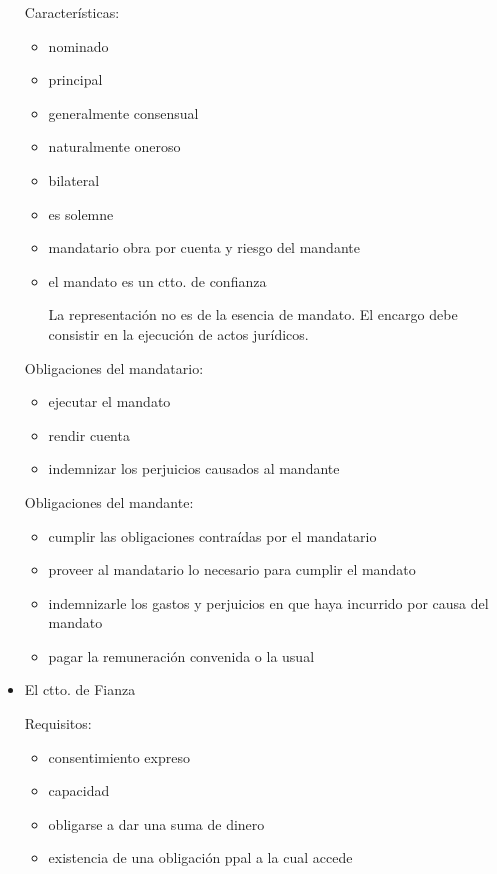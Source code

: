 \documentclass[]{article}
\providecommand{\tightlist}{%
  \setlength{\itemsep}{0pt}\setlength{\parskip}{0pt}}
\begin{document}
\begin{itemize}
  Características:

  \begin{itemize}
  \item
    nominado
  \item
    principal
  \item
    generalmente consensual
  \item
    naturalmente oneroso
  \item
    bilateral
  \item
    es solemne
  \item
    mandatario obra por cuenta y riesgo del mandante
  \item
    el mandato es un ctto. de confianza

    La representación no es de la esencia de mandato. El encargo debe
    consistir en la ejecución de actos jurídicos.
  \end{itemize}

  Obligaciones del mandatario:

  \begin{itemize}
  \tightlist
  \item
    ejecutar el mandato
  \item
    rendir cuenta
  \item
    indemnizar los perjuicios causados al mandante
  \end{itemize}

  Obligaciones del mandante:

  \begin{itemize}
  \tightlist
  \item
    cumplir las obligaciones contraídas por el mandatario
  \item
    proveer al mandatario lo necesario para cumplir el mandato
  \item
    indemnizarle los gastos y perjuicios en que haya incurrido por causa
    del mandato
  \item
    pagar la remuneración convenida o la usual
  \end{itemize}
\item
  El ctto. de Fianza

  Requisitos:

  \begin{itemize}
  \tightlist
  \item
    consentimiento expreso
  \item
    capacidad
  \item
    obligarse a dar una suma de dinero
  \item
    existencia de una obligación ppal a la cual accede
  \end{itemize}


\end{itemize}
\end{document}
